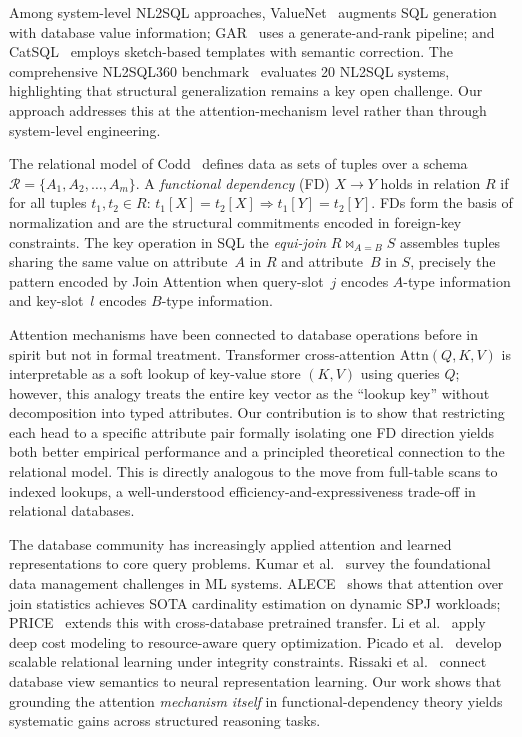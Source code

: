 \documentclass[review]{elsarticle}
\begin{document}
Among system-level NL2SQL approaches, ValueNet~\cite{brunner2021valuenet} augments SQL generation with database value information; GAR~\cite{fan2023gar} uses a generate-and-rank pipeline; and CatSQL~\cite{fu2023catsql} employs sketch-based templates with semantic correction. The comprehensive NL2SQL360 benchmark~\cite{li2024nl2sql360} evaluates 20 NL2SQL systems, highlighting that structural generalization remains a key open challenge. Our approach addresses this at the attention-mechanism level rather than through system-level engineering.

The relational model of Codd~\cite{codd1970relational} defines data as sets of tuples over a schema $\mathcal{R} = \{A_1, A_2, \ldots, A_m\}$. A \emph{functional dependency} (FD) $X \to Y$ holds in relation $R$ if for all tuples $t_1, t_2 \in R$: $t_1[X] = t_2[X] \Rightarrow t_1[Y] = t_2[Y]$. FDs form the basis of normalization and are the structural commitments encoded in foreign-key constraints. The key operation in SQL the \emph{equi-join} $R \bowtie_{A=B} S$ assembles tuples sharing the same value on attribute~$A$ in $R$ and attribute~$B$ in $S$, precisely the pattern encoded by Join Attention when query-slot~$j$ encodes $A$-type information and key-slot~$l$ encodes $B$-type information.

Attention mechanisms have been connected to database operations before in spirit but not in formal treatment. Transformer cross-attention $\mathrm{Attn}(Q, K, V)$ is interpretable as a soft lookup of key-value store $(K, V)$ using queries $Q$; however, this analogy treats the entire key vector as the ``lookup key'' without decomposition into typed attributes. Our contribution is to show that restricting each head to a specific attribute pair formally isolating one FD direction yields both better empirical performance and a principled theoretical connection to the relational model. This is directly analogous to the move from full-table scans to indexed lookups, a well-understood efficiency-and-expressiveness trade-off in relational databases.

The database community has increasingly applied attention and learned representations to core query problems. Kumar et al.~\cite{kumar2017sigmod} survey the foundational data management challenges in ML systems. ALECE~\cite{li2023alece} shows that attention over join statistics achieves SOTA cardinality estimation on dynamic SPJ workloads; PRICE~\cite{zeng2024price} extends this with cross-database pretrained transfer. Li et al.~\cite{li2022icde} apply deep cost modeling to resource-aware query optimization. Picado et al.~\cite{picado2021sigmod} develop scalable relational learning under integrity constraints. Rissaki et al.~\cite{rissaki2026vldb} connect database view semantics to neural representation learning. Our work shows that grounding the attention \emph{mechanism itself} in functional-dependency theory yields systematic gains across structured reasoning tasks.
\end{document}
